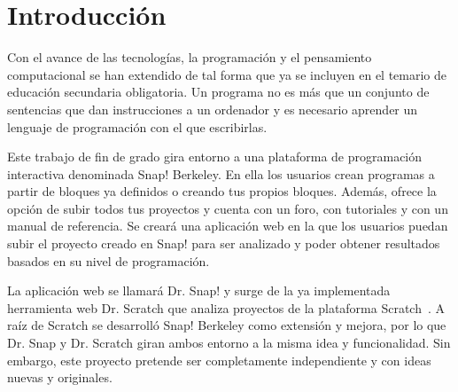 \documentclass[a4paper, 12pt]{book}
\begin{document}


\tableofcontents 
\cleardoublepage
\listoffigures %



\cleardoublepage
\chapter{Introducción}
\label{sec:intro} %
Con el avance de las tecnologías, la programación y el pensamiento computacional se han extendido de tal forma que ya se incluyen en el temario de educación secundaria obligatoria. Un programa no es más que un conjunto de sentencias que dan instrucciones a un ordenador y es necesario aprender un lenguaje de programación con el que escribirlas.

Este trabajo de fin de grado gira entorno a una plataforma de programación interactiva denominada Snap! Berkeley. En ella los usuarios crean programas a partir de bloques ya definidos o creando tus propios bloques. Además, ofrece la opción de subir todos tus proyectos y cuenta con un foro, con tutoriales y con un manual de referencia. Se creará una aplicación web en la que los usuarios puedan subir el proyecto creado en Snap! para ser analizado y poder obtener resultados basados en su nivel de programación. 

La aplicación web se llamará Dr. Snap! y surge de la ya implementada herramienta web Dr. Scratch que analiza proyectos de la plataforma Scratch~\cite{moreno2015dr}. A raíz de Scratch se desarrolló Snap! Berkeley como extensión y mejora, por lo que Dr. Snap y Dr. Scratch giran ambos entorno a la misma idea y funcionalidad. Sin embargo, este proyecto pretende ser completamente independiente y con ideas nuevas y originales.
\end{document}
